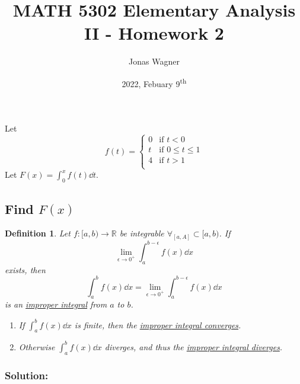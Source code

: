 \documentclass[]{article}
\title{MATH 5302 Elementary Analysis II - Homework 2}
\author{Jonas Wagner}
\date{2022, Febuary 9\textsuperscript{th}}
\newcommand{\R}{\mathbb{R}}
\newtheorem{definition}{Definition}
\begin{document}
\maketitle

\section{}
Let\[
    f(t) = \begin{cases}
        0 &\text{if } t<0\\
        t &\text{if } 0 \leq t \leq 1\\
        4 &\text{if } t>1\\
    \end{cases}
\] Let $F(x) = \int_{0}^{x} f(t) \dd t$.

\subsection{Find $F(x)$}

\begin{definition}\label{def:int_improp_a_b}
    Let $f : [a,b) \to \R$ be integrable $\forall_[a,A] \subset [a,b)$.
    If \[
        \lim_{\epsilon\to 0^{+}} \int_{a}^{b-\epsilon} f(x) \dd{x}
    \] exists, then \[
        \int_{a}^{b} f(x) \dd{x} = \lim_{\epsilon\to 0^{+}} \int_{a}^{b-\epsilon} f(x) \dd{x}
    \] is an \underline{\emph{improper integral}} from $a$ to $b$.
    \begin{enumerate}
        \item If $\int_{a}^{b} f(x) \dd{x}$ is finite, then the \emph{\underline{improper integral converges}}.
        \item Otherwise $\int_{a}^{b} f(x) \dd{x}$ diverges, and thus the \emph{\underline{improper integral diverges}}.
    \end{enumerate}
\end{definition}

\subsubsection{Solution:}
\end{document}
